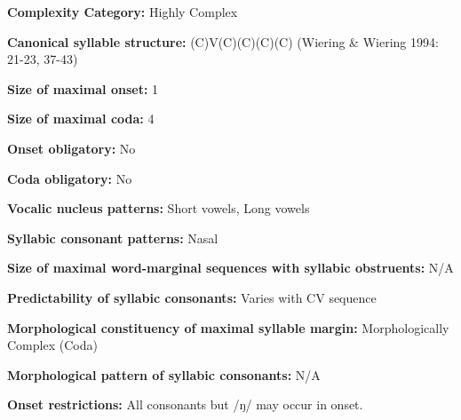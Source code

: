 \begin{styleBody}
\textbf{Complexity Category:} Highly Complex
\end{styleBody}

\begin{styleBody}
\textbf{Canonical syllable structure:} (C)V(C)(C)(C)(C)\textbf{ }(Wiering \& Wiering 1994: 21-23, 37-43)
\end{styleBody}

\begin{styleBody}
\textbf{Size of maximal onset:} 1
\end{styleBody}

\begin{styleBody}
\textbf{Size of maximal coda:} 4
\end{styleBody}

\begin{styleBody}
\textbf{Onset obligatory:} No
\end{styleBody}

\begin{styleBody}
\textbf{Coda obligatory:} No
\end{styleBody}

\begin{styleBody}
\textbf{Vocalic nucleus patterns:} Short vowels, Long vowels
\end{styleBody}

\begin{styleBody}
\textbf{Syllabic consonant patterns:} Nasal
\end{styleBody}

\begin{styleBody}
\textbf{Size of maximal word{}-marginal sequences with syllabic obstruents:} N/A
\end{styleBody}

\begin{styleBody}
\textbf{Predictability of syllabic consonants:} Varies with CV sequence
\end{styleBody}

\begin{styleBody}
\textbf{Morphological constituency of maximal syllable margin:} Morphologically Complex (Coda)
\end{styleBody}

\begin{styleBody}
\textbf{Morphological pattern of syllabic consonants:} N/A
\end{styleBody}

\begin{styleBody}
\textbf{Onset restrictions: }All consonants but /ŋ/ may occur in onset.
\end{styleBody}

